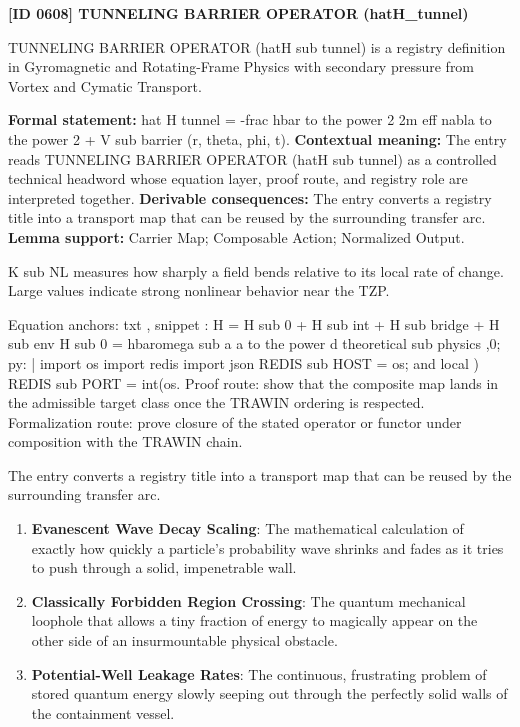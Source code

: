 \clearpage
\noindent\textbf{[ID 0608] TUNNELING BARRIER OPERATOR (hatH\_tunnel)}\par
\vspace{0.35em}
\begingroup\small
{}
TUNNELING BARRIER OPERATOR (hatH sub tunnel) is a registry definition in Gyromagnetic and Rotating-Frame Physics with secondary pressure from Vortex and Cymatic Transport.

\begingroup\footnotesize\setlength{\emergencystretch}{3em}\sloppy
\textbf{Formal statement:} hat H tunnel = -frac hbar to the power 2 2m eff nabla to the power 2 + V sub barrier (r, theta, phi, t). \textbf{Contextual meaning:} The entry reads TUNNELING BARRIER OPERATOR (hatH sub tunnel) as a controlled technical headword whose equation layer, proof route, and registry role are interpreted together. \textbf{Derivable consequences:} The entry converts a registry title into a transport map that can be reused by the surrounding transfer arc. \textbf{Lemma support:} Carrier Map; Composable Action; Normalized Output.\par
\endgroup

K sub NL measures how sharply a field bends relative to its local rate of change. Large values indicate strong nonlinear behavior near the TZP.

Equation anchors: txt , snippet : H = H sub 0 + H sub int + H sub bridge + H sub env H sub 0 = hbaromega sub a a to the power d theoretical sub physics ,0; py: | import os import redis import json REDIS sub HOST = os; and local ) REDIS sub PORT = int(os. Proof route: show that the composite map lands in the admissible target class once the TRAWIN ordering is respected. Formalization route: prove closure of the stated operator or functor under composition with the TRAWIN chain.

The entry converts a registry title into a transport map that can be reused by the surrounding transfer arc.
\endgroup

\begin{enumerate}[leftmargin=1.6em,itemsep=6pt,topsep=4pt]
\item \textbf{Evanescent Wave Decay Scaling}: The mathematical calculation of exactly how quickly a particle's probability wave shrinks and fades as it tries to push through a solid, impenetrable wall.
\item \textbf{Classically Forbidden Region Crossing}: The quantum mechanical loophole that allows a tiny fraction of energy to magically appear on the other side of an insurmountable physical obstacle.
\item \textbf{Potential-Well Leakage Rates}: The continuous, frustrating problem of stored quantum energy slowly seeping out through the perfectly solid walls of the containment vessel.
\end{enumerate}

